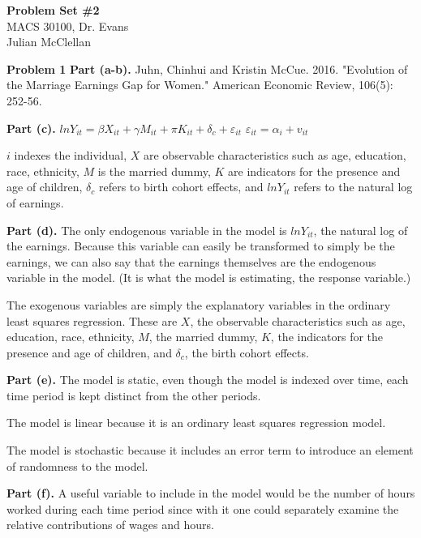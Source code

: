 \documentclass[letterpaper,12pt]{article}
\theoremstyle{definition}
\begin{document}
\begin{flushleft}
  \textbf{\large{Problem Set \#2}} \\
  MACS 30100, Dr. Evans \\
  Julian McClellan
\end{flushleft}

\vspace{5mm}

\noindent\textbf{Problem 1} 
\newline
\noindent\textbf{Part (a-b).} 
Juhn, Chinhui and Kristin McCue. 2016. "Evolution of the Marriage Earnings Gap for Women." American Economic Review, 106(5): 252-56.

\noindent\textbf{Part (c).} 
$ln Y_{it}=\beta X_{it}+\gamma M_{it}+\pi K_{it}+\delta _{c}+\varepsilon _{it}$
$\varepsilon _{it} = \alpha _{i}+v_{it}$

$i$ indexes the individual, $X$ are observable characteristics such as age, education, race, ethnicity, $M$ is the married dummy, $K$ are indicators for the presence and age of children, $\delta _{c}$ refers to birth cohort effects, and $ln Y_{it}$ refers to the natural log of earnings.

\noindent\textbf{Part (d).}
The only endogenous variable in the model is $ln Y_{it}$, the natural log of the earnings. Because this variable can easily be transformed to simply be the earnings, we can also say that the earnings themselves are the endogenous variable in the model. (It is what the model is estimating, the response variable.)

The exogenous variables are simply the explanatory variables in the ordinary least squares regression. These are $X$, the observable characteristics such as age, education, race, ethnicity, $M$, the married dummy, $K$, the indicators for the presence and age of children, and $\delta _{c}$, the birth cohort effects.

\noindent\textbf{Part (e).}
The model is static, even though the model is indexed over time, each time period is kept distinct from the other periods.

The model is linear because it is an ordinary least squares regression model.

The model is stochastic because it includes an error term to introduce an element of randomness to the model.

\noindent\textbf{Part (f).}
A useful variable to include in the model would be the number of hours worked during each time period since with it one could separately examine the relative contributions of wages and hours.
\end{document}
